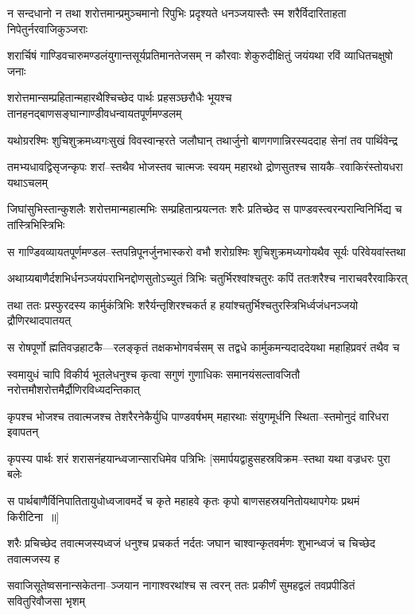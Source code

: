 \twolineshloka
{न सन्दधानो न तथा शरोत्तमान्प्रमुञ्चमानो रिपुभिः प्रदृश्यते}
{धनञ्जयास्तैः स्म शरैर्विदारिताहता निपेतुर्नरवाजिकुञ्जराः}


\twolineshloka
{शरार्चिषं गाण्डिवचारुमण्डलंयुगान्तसूर्यप्रतिमानतेजसम्}
{न कौरवाः शेकुरुदीक्षितुं जयंयथा रविं व्याधितचक्षुषो जनाः}


\twolineshloka
{शरोत्तमान्सम्प्रहितान्महारथैश्चिच्छेद पार्थः प्रहसञ्छरौधैः}
{भूयश्च तानहनद्बाणसङ्घान्गाण्डीवधन्वायतपूर्णमण्डलम्}


\twolineshloka
{यथोग्ररश्मिः शुचिशुक्रमध्यगःसुखं विवस्वान्हरते जलौघान्}
{तथार्जुनो बाणगणान्निरस्यददाह सेनां तव पार्थिवेन्द्र}


\twolineshloka
{तमभ्यधावद्विसृजन्कृपः शरां--स्तथैव भोजस्तव चात्मजः स्वयम्}
{महारथो द्रोणसुतश्च सायकै--रवाकिरंस्तोयधरा यथाऽचलम्}


\twolineshloka
{जिघांसुभिस्तान्कुशलैः शरोत्तमान्महात्मभिः सम्प्रहितान्प्रयत्नतः}
{शरैः प्रतिच्छेद स पाण्डवस्त्वरन्परान्विनिर्भिद्य च तांस्त्रिभिस्त्रिभिः}


\twolineshloka
{स गाण्डिवव्यायतपूर्णमण्डल--स्तपन्रिपूनर्जुनभास्करो वभौ}
{शरोग्रश्मिः शुचिशुक्रमध्यगोयथैव सूर्यः परिवेयवांस्तथा}


\twolineshloka
{अथाग्र्यबाणैर्दशभिर्धनञ्जयंपराभिनद्दोणसुतोऽच्युतं त्रिभिः}
{चतुर्भिरश्वांश्चतुरः कपिं ततःशरैश्च नाराचवरैरवाकिरत्}


\twolineshloka
{तथा ततः प्रस्फुरदस्य कार्मुकंत्रिभिः शरैर्यन्तृशिरश्चकर्त ह}
{हयांश्चतुर्भिश्चतुरस्त्रिभिर्ध्वजंधनञ्जयो द्रौणिरथादपातयत्}


\twolineshloka
{स रोषपूर्णो ह्मतिवज्रहाटकै---रलङ्कृतं तक्षकभोगवर्चसम्}
{स तद्वधे कार्मुकमन्यदाददेयथा महाहिप्रवरं तथैव च}


\twolineshloka
{स्वमायुधं चापि विकीर्य भूतलेधनुश्च कृत्वा सगुणं गुणाधिकः}
{समानयंसल्तावजितौ नरोत्तमौशरोत्तमैर्द्रौणिरविध्यदन्तिकात्}


\twolineshloka
{कृपश्च भोजश्च तवात्मजश्च तेशरैरनेकैर्युधि पाण्डवर्षभम्}
{महारथाः संयुगमूर्धनि स्थिता--स्तमोनुदं वारिधरा इवापतन्}


\twolineshloka
{कृपस्य पार्थः शरं शरासनंहयान्ध्वजान्सारधिमेव पत्रिभिः}
{[समार्पयद्वाहुसहस्रविक्रम--स्तथा यथा वज्रधरः पुरा बलेः}


\twolineshloka
{स पार्थबाणैर्विनिपातितायुधोध्वजावमर्दे च कृते महाहवे}
{कृतः कृपो बाणसहस्रयनितोयथापगेयः प्रथमं किरीटिना ॥]}


\twolineshloka
{शरैः प्रचिच्छेद तवात्मजस्यध्वजं धनुश्च प्रचकर्त नर्दतः}
{जघान चाश्वान्कृतवर्मणः शुभान्ध्वजं च चिच्छेद तवात्मजस्य ह}


\twolineshloka
{सवाजिसूतेष्वसनान्सकेतना--ञ्जयान नागाश्वरथांश्च स त्वरन्}
{ततः प्रकीर्णं सुमहद्वलं तवप्रपीडितं सवितुरिवौजसा भृशम्}


